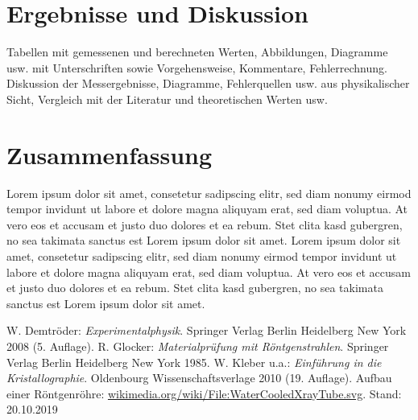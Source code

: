 \documentclass[a4paper,twoside,final]{article}
\begin{document}
\section{Ergebnisse und Diskussion}
Tabellen mit gemessenen und berechneten Werten, Abbildungen, Diagramme usw. mit Unterschriften sowie Vorgehensweise, Kommentare, Fehlerrechnung.\\
Diskussion der Messergebnisse, Diagramme, Fehlerquellen usw. aus physikalischer Sicht, Vergleich mit der Literatur und theoretischen Werten usw.

\section{Zusammenfassung}
Lorem ipsum dolor sit amet, consetetur sadipscing elitr, sed diam nonumy eirmod tempor invidunt ut labore et dolore magna aliquyam erat, sed diam voluptua. At vero eos et accusam et justo duo dolores et ea rebum. Stet clita kasd gubergren, no sea takimata sanctus est Lorem ipsum dolor sit amet. Lorem ipsum dolor sit amet, consetetur sadipscing elitr, sed diam nonumy eirmod tempor invidunt ut labore et dolore magna aliquyam erat, sed diam voluptua. At vero eos et accusam et justo duo dolores et ea rebum. Stet clita kasd gubergren, no sea takimata sanctus est Lorem ipsum dolor sit amet.


\begin{thebibliography}{xxx}
	W. Demtröder: \textit{Experimentalphysik}. Springer Verlag Berlin Heidelberg New York 2008 (5. Auflage).
	R. Glocker: \textit{Materialprüfung mit Röntgenstrahlen}. Springer Verlag Berlin Heidelberg New York 1985.
	W. Kleber u.a.: \textit{Einführung in die Kristallographie}. Oldenbourg Wissenschaftsverlage 2010 (19. Auflage).
  Aufbau einer Röntgenröhre: \url{wikimedia.org/wiki/File:WaterCooledXrayTube.svg}. Stand: 20.10.2019
\end{thebibliography}
\end{document}

